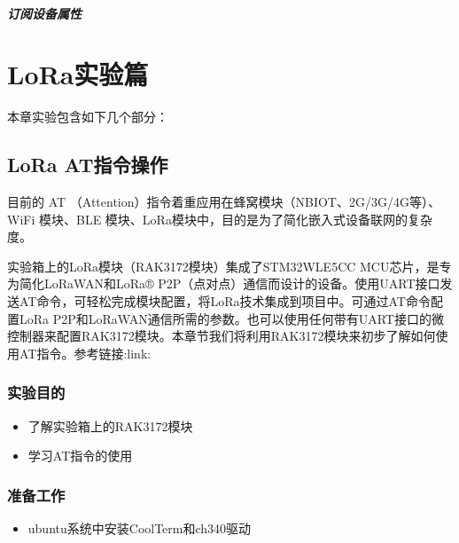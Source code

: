\documentclass[a4paper,12pt,english]{sphinxmanual}
\begin{document}
{{\paragraph{订阅设备属性}
\label{\detokenize{exp-esp32/iot-cloud:id6}}
\sphinxstepscope


\chapter{LoRa实验篇}
\label{\detokenize{exp-lora/index:lora}}\label{\detokenize{exp-lora/index::doc}}
\sphinxAtStartPar
本章实验包含如下几个部分：

\sphinxstepscope


\section{LoRa AT指令操作}
\label{\detokenize{exp-lora/at-command:lora-at}}\label{\detokenize{exp-lora/at-command::doc}}
\sphinxAtStartPar
目前的 AT （Attention）指令着重应用在蜂窝模块（NB\sphinxhyphen{}IOT、2G/3G/4G等）、WiFi 模块、BLE 模块、LoRa模块中，目的是为了简化嵌入式设备联网的复杂度。

\sphinxAtStartPar
实验箱上的LoRa模块（RAK3172模块）集成了STM32WLE5CC MCU芯片，是专为简化LoRaWAN和LoRa® P2P（点对点）通信而设计的设备。使用UART接口发送AT命令，可轻松完成模块配置，将LoRa技术集成到项目中。可通过AT命令配置LoRa P2P和LoRaWAN通信所需的参数。也可以使用任何带有UART接口的微控制器来配置RAK3172模块。本章节我们将利用RAK3172模块来初步了解如何使用AT指令。参考链接:link: 


\subsection{实验目的}
\label{\detokenize{exp-lora/at-command:id1}}\begin{itemize}
\item {} 
\sphinxAtStartPar
了解实验箱上的RAK3172模块

\item {} 
\sphinxAtStartPar
学习AT指令的使用

\end{itemize}


\subsection{准备工作}
\label{\detokenize{exp-lora/at-command:id2}}\begin{itemize}
\item {} 
\sphinxAtStartPar
ubuntu系统中安装CoolTerm和ch340驱动


\end{itemize}}}
\end{document}
